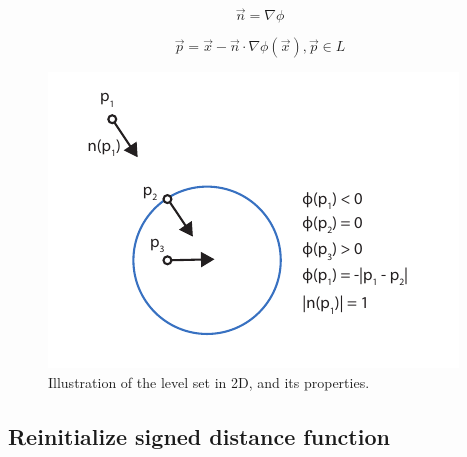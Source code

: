 \begin{equation}
\label{eq:normal2}
 \vec{n} = \nabla \phi
\end{equation} 

\begin{equation}
\label{eq:find_point}
 \vec{p} = \vec{x} - \vec{n} \cdot \nabla\phi(\vec{x}), \vec{p} \in L
\end{equation}

\begin{figure}[h!]
	\centering
		\includegraphics[width=.5 \linewidth]{figures/levelset.pdf}
	\caption{Illustration of the level set in 2D, and its properties.}
	\label{fig:levelset}
\end{figure}

\subsection{Reinitialize signed distance function}
